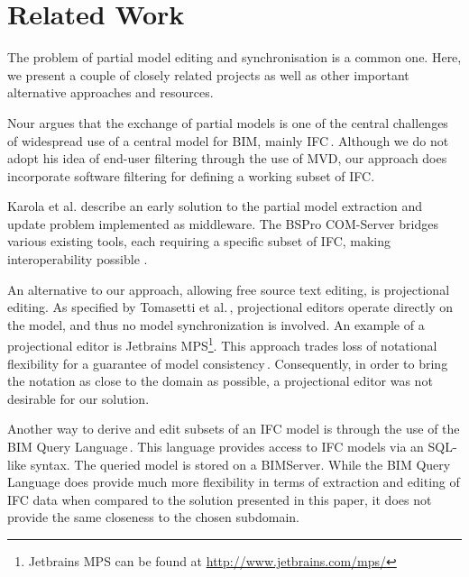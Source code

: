 \section{Related Work}
\label{sec:related_work}
The problem of partial model editing and synchronisation is a common one. Here, we present a couple of closely related projects as well as other important alternative approaches and resources.

Nour argues that the exchange of partial models is one of the central challenges of widespread use of a central model for BIM, mainly IFC\,\cite{nour08}. Although we do not adopt his idea of end-user filtering through the use of MVD, our approach does incorporate software filtering for defining a working subset of IFC.

Karola et al. describe an early solution to the partial model extraction and update problem implemented as middleware. The BSPro COM-Server bridges various existing tools, each requiring a specific subset of IFC, making interoperability possible \cite{karola02}.

An alternative to our approach, allowing free source text editing, is projectional editing. As specified by Tomasetti et al.\,\cite{tomasetti11}, projectional editors operate directly on the model, and thus no model synchronization is involved. An example of a projectional editor is Jetbrains MPS\footnote{Jetbrains MPS can be found at \url{http://www.jetbrains.com/mps/}}. This approach trades loss of notational flexibility for a guarantee of model consistency\,\cite{conf/models/Voelter10}. Consequently, in order to bring the notation as close to the domain as possible, a projectional editor was not desirable for our solution.

Another way to derive and edit subsets of an IFC model is through the use of the BIM Query Language\,\cite{mazairac10}. This language provides access to IFC models via an SQL-like syntax. The queried model is stored on a BIMServer. While the BIM Query Language does provide much more flexibility in terms of extraction and editing of IFC data when compared to the solution presented in this paper, it does not provide the same closeness to the chosen subdomain.

